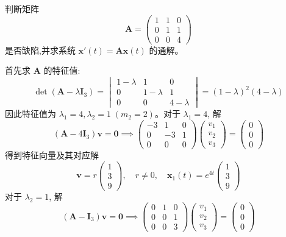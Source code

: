 \begin{questions}
    \question 判断矩阵 
    \[
    \boldsymbol{A} = \begin{pmatrix} 1 & 1 & 0 \\ 0 & 1 & 1 \\ 0 & 0 & 4 \end{pmatrix}
    \]
    是否缺陷,并求系统 $\boldsymbol{x}'(t) = \boldsymbol{A} \boldsymbol{x}(t)$ 的通解。
    \begin{solution}
        首先求 $\boldsymbol{A}$ 的特征值:
        \[
        \det(\boldsymbol{A} - \lambda \boldsymbol{I}_3) = \begin{vmatrix} 1-\lambda & 1 & 0 \\ 0 & 1-\lambda & 1 \\ 0 & 0 & 4-\lambda \end{vmatrix} = (1-\lambda)^2 (4-\lambda)
        \]
        因此特征值为 $\lambda_1 = 4,\lambda_2 = 1 \;(m_2=2)$。对于 $\lambda_1 = 4$, 解
        \[
        (\boldsymbol{A} - 4\boldsymbol{I}_3) \boldsymbol{v} = \boldsymbol{0} \implies 
        \begin{pmatrix}-3 & 1 & 0 \\ 0 & -3 & 1 \\ 0 & 0 & 0 \end{pmatrix} \begin{pmatrix} v_1 \\ v_2 \\ v_3 \end{pmatrix} = \begin{pmatrix}0\\0\\0\end{pmatrix}
        \]
        得到特征向量及其对应解
        \[
        \boldsymbol{v} = r \begin{pmatrix} 1 \\ 3 \\ 9 \end{pmatrix}, \quad r \neq 0, \quad \boldsymbol{x}_1(t) = e^{4t} \begin{pmatrix} 1 \\ 3 \\ 9 \end{pmatrix}
        \]
        对于 $\lambda_2 = 1$, 解
        \[
        (\boldsymbol{A} - \boldsymbol{I}_3) \boldsymbol{v} = \boldsymbol{0} \implies 
        \begin{pmatrix} 0 & 1 & 0 \\ 0 & 0 & 1 \\ 0 & 0 & 3 \end{pmatrix} \begin{pmatrix} v_1 \\ v_2 \\ v_3 \end{pmatrix} = \begin{pmatrix}0\\0\\0\end{pmatrix}
\]
\end{solution}
\end{questions}
